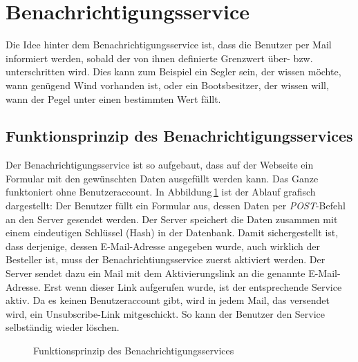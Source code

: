 \section{Benachrichtigungsservice}
\label{notifications}
Die Idee hinter dem Benachrichtigungsservice ist, dass die Benutzer per Mail informiert werden, sobald der von ihnen definierte Grenzwert über- bzw. unterschritten wird. Dies kann zum Beispiel ein Segler sein, der wissen möchte, wann genügend Wind vorhanden ist, oder ein Bootsbesitzer, der wissen will, wann der Pegel unter einen bestimmten Wert fällt.


\subsection{Funktionsprinzip des Benachrichtigungsservices}

Der Benachrichtigungsservice ist so aufgebaut, dass auf der Webseite ein Formular mit den gewünschten Daten ausgefüllt werden kann. Das Ganze funktoniert ohne Benutzeraccount. In Abbildung\,\ref{img:notificationKonzept} ist der Ablauf grafisch dargestellt: Der Benutzer füllt ein Formular aus, dessen Daten per \emph{POST}-Befehl an den Server gesendet werden. Der Server speichert die Daten zusammen mit einem eindeutigen Schlüssel (Hash) in der Datenbank. Damit sichergestellt ist, dass derjenige, dessen E-Mail-Adresse angegeben wurde, auch wirklich der Besteller ist, muss der Benachrichtiungsservice zuerst aktiviert werden. Der Server sendet dazu ein Mail mit dem Aktivierungslink an die genannte E-Mail-Adresse. Erst wenn dieser Link aufgerufen wurde, ist der entsprechende Service aktiv. Da es keinen Benutzeraccount gibt, wird in jedem Mail, das versendet wird, ein Unsubscribe-Link mitgeschickt. So kann der Benutzer den Service selbständig wieder löschen.

\begin{figure}[h!]
	\centering
	\caption{Funktionsprinzip des Benachrichtigungsservices}
	\label{img:notificationKonzept}
\end{figure}

